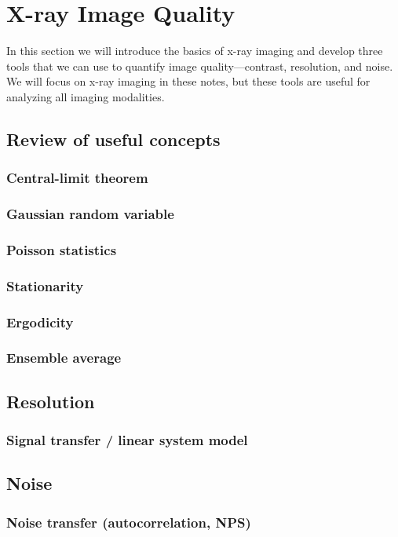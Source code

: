 \documentclass[mphy386-notes.tex]{subfiles}
\begin{document}
\section{X-ray Image Quality}
In this section we will introduce the basics of x-ray imaging and develop three
tools that we can use to quantify image quality---contrast, resolution, and
noise. We will focus on x-ray imaging in these notes, but these tools are
useful for analyzing all imaging modalities.

\subsection{Review of useful concepts}
\subsubsection{Central-limit theorem}
\subsubsection{Gaussian random variable}
\subsubsection{Poisson statistics}
\subsubsection{Stationarity}
\subsubsection{Ergodicity}
\subsubsection{Ensemble average}

\subsection{Resolution}
\subsubsection{Signal transfer / linear system model}

\subsection{Noise}
\subsubsection{Noise transfer (autocorrelation, NPS)}
\end{document}
